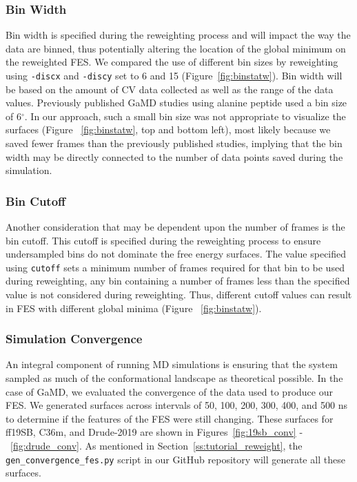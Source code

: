 \documentclass[9pt,tutorial,pubversion]{livecoms}
\begin{document}
\subsubsection{Bin Width} 
Bin width is specified during the reweighting process and will impact the way the data are binned, thus potentially altering the location of the global minimum on the reweighted FES. We compared the use of different bin sizes by reweighting using \texttt{-discx} and \texttt{-discy} set to 6 and 15 (Figure~\ref{fig:binstatw}). Bin width will be based on the amount of CV data collected as well as the range of the data values. Previously published GaMD studies using alanine peptide used a bin size of 6$^{\circ}$.\cite{miao_gaussian_2015} In our approach, such a small bin size was not appropriate to visualize the surfaces (Figure ~\ref{fig:binstatw}, top and bottom left), most likely because we saved fewer frames than the previously published studies, implying that the bin width may be directly connected to the number of data points saved during the simulation.

\subsubsection{Bin Cutoff}
Another consideration that may be dependent upon the number of frames is the bin cutoff. This cutoff is specified during the reweighting process to ensure undersampled bins do not dominate the free energy surfaces. The value specified using \texttt{cutoff} sets a minimum number of frames required for that bin to be used during reweighting, any bin containing a number of frames less than the specified value is not considered during reweighting. Thus, different cutoff values can result in FES with different global minima (Figure ~\ref{fig:binstatw}).

\subsubsection{Simulation Convergence} 
An integral component of running MD simulations is ensuring that the system sampled as much of the conformational landscape as theoretical possible. In the case of GaMD, we evaluated the convergence of the data used to produce our FES. We generated surfaces across intervals of 50, 100, 200, 300, 400, and 500 ns to determine if the features of the FES were still changing. These surfaces for ff19SB, C36m, and Drude-2019 are shown in Figures~\ref{fig:19sb_conv} -~\ref{fig:drude_conv}. As mentioned in Section~\ref{ss:tutorial_reweight}, the \texttt{gen\_convergence\_fes.py} script in our GitHub repository will generate all these surfaces.
\end{document}
